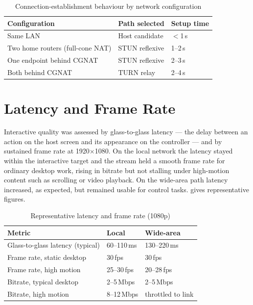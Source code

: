 \begin{table}[H]
\centering
\caption{Connection-establishment behaviour by network configuration}
\label{tab:conn}
\small
\begin{tabular}{@{}p{6cm}p{3.4cm}p{3.4cm}@{}}
\toprule
\textbf{Configuration} & \textbf{Path selected} & \textbf{Setup time} \\
\midrule
Same LAN                         & Host candidate      & $<$1\,s \\
Two home routers (full-cone NAT) & STUN reflexive      & 1--2\,s \\
One endpoint behind CGNAT        & STUN reflexive      & 2--3\,s \\
Both behind CGNAT                & TURN relay          & 2--4\,s \\
\bottomrule
\end{tabular}
\end{table}

\section{Latency and Frame Rate}

Interactive quality was assessed by glass-to-glass latency --- the delay between
an action on the host screen and its appearance on the controller --- and by
sustained frame rate at 1920$\times$1080. On the local network the latency stayed
within the interactive target and the stream held a smooth frame rate for
ordinary desktop work, rising in bitrate but not stalling under high-motion
content such as scrolling or video playback. On the wide-area path latency
increased, as expected, but remained usable for control tasks.
 gives representative figures.

\begin{table}[H]
\centering
\caption{Representative latency and frame rate (1080p)}
\label{tab:latency}
\small
\begin{tabular}{@{}p{4.6cm}p{3.2cm}p{3.2cm}@{}}
\toprule
\textbf{Metric} & \textbf{Local} & \textbf{Wide-area} \\
\midrule
Glass-to-glass latency (typical) & 60--110\,ms & 130--220\,ms \\
Frame rate, static desktop       & 30\,fps     & 30\,fps \\
Frame rate, high motion          & 25--30\,fps & 20--28\,fps \\
Bitrate, typical desktop         & 2--5\,Mbps  & 2--5\,Mbps \\
Bitrate, high motion             & 8--12\,Mbps & throttled to link \\
\bottomrule
\end{tabular}
\end{table}

